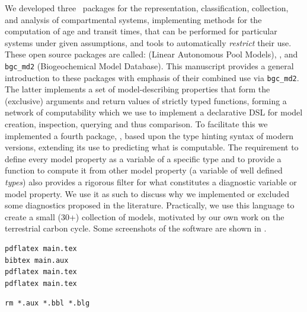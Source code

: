 We developed three \python\ packages for the representation, classification, collection, and analysis  of compartmental systems, implementing methods for the computation of age and transit times, that can be performed for particular systems under given assumptions, and tools to automatically \emph{restrict} their use.
These open source packages are called: 
\LAPM{} (Linear Autonomous Pool Models),
\CompartmentalSystems, and
\texttt{bgc\_md2} (Biogeochemical Model Database).
This manuscript provides a general introduction to these packages 
with emphasis of their combined use via \texttt{bgc\_md2}.
The latter implements a set of model-describing properties that form the (exclusive) arguments and return values of strictly typed functions, forming a network of computability which we use 
to implement a declarative DSL for model creation, inspection, querying and thus comparison.
To facilitate this we implemented a fourth package, \ComputabilityGraphs, based upon the type hinting syntax of modern \python{} versions, extending its use to predicting what is computable.   
The requirement to define every model property as a variable of a specific
type and to provide a function to compute it from other model property (\ie a variable of well defined \emph{types}) also provides a rigorous filter for what
constitutes a diagnostic variable or model property. 
We use it as such to discuss why we implemented or excluded some diagnostics proposed in the literature.
Practically, we use this language to create a small
(30+) collection of models, motivated by our own work on the terrestrial carbon
cycle.  Some screenshots of the software are shown in . 
\begin{verbatim}
pdflatex main.tex
bibtex main.aux
pdflatex main.tex
pdflatex main.tex
\end{verbatim}
\begin{verbatim}
rm *.aux *.bbl *.blg
\end{verbatim}


